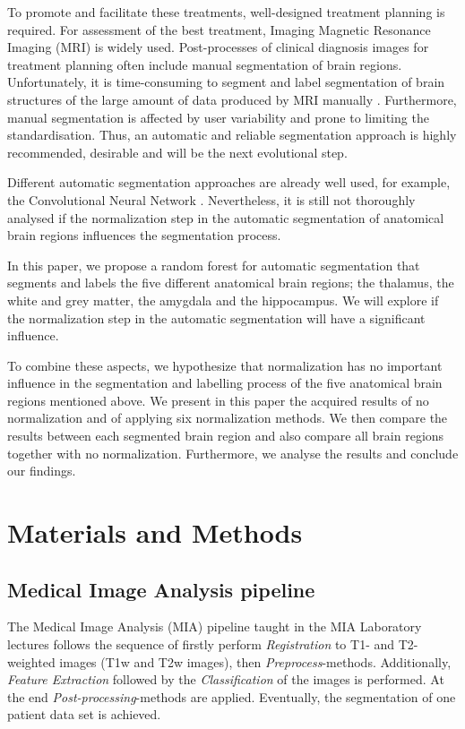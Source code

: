 \documentclass[article]{IEEEtran}
\begin{document}
	
	To promote and facilitate these treatments, well-designed treatment planning is required.
	For assessment of the best treatment, Imaging Magnetic Resonance Imaging (MRI) is widely used. 
	Post-processes of clinical diagnosis images for treatment planning often include manual segmentation of brain regions. 
	Unfortunately, it is time-consuming to segment and label segmentation of brain structures of the large amount of data produced by MRI manually . 
	Furthermore, manual segmentation is affected by user variability and prone to limiting the standardisation. 
	Thus, an automatic and reliable segmentation approach is highly recommended, desirable and will be the next evolutional step. \cite{Pereira2016} \cite{Brebisson2015}


	Different automatic segmentation approaches are already well used, for example, the Convolutional Neural Network \cite{Pereira2016}.
	Nevertheless, it is still not thoroughly analysed if the normalization step in the automatic segmentation of anatomical brain regions influences the segmentation process.
	
	
	In this paper, we propose a random forest for automatic segmentation that segments and labels the five different anatomical brain regions; the thalamus, the white and grey matter, the amygdala and the hippocampus. We will explore if the normalization step in the automatic segmentation will have a significant influence. 
	
	
	To combine these aspects, we hypothesize that normalization has no important influence in the segmentation and labelling process of the five anatomical brain regions mentioned above. 
	We present in this paper the acquired results of no normalization and of applying six normalization methods. 
	We then compare the results between each segmented brain region and also compare all brain regions together with no normalization. 
	Furthermore, we analyse the results and conclude our findings. 



\section{Materials and Methods}

\subsection{Medical Image Analysis pipeline}
	The Medical Image Analysis (MIA) pipeline taught in the MIA Laboratory lectures follows the sequence of firstly perform {\itshape Registration} to T1- and T2-weighted images (T1w and T2w images), then {\itshape Preprocess}-methods. Additionally, {\itshape Feature Extraction} followed by the {\itshape Classification} of the images is performed. 
	At the end {\itshape Post-processing}-methods are applied. Eventually, the segmentation of one patient data set is achieved. 
\end{document}
